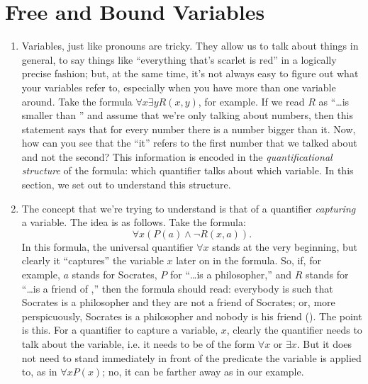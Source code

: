 \section{Free and Bound Variables}

	\begin{enumerate}[\thesection.1]

		
		\item Variables, just like pronouns are tricky. They allow us to talk about things in general, to say things like ``everything that's scarlet is red'' in a logically precise fashion; but, at the same time, it's not always easy to figure out what your variables refer to, especially when you have more than one variable around. Take the formula $\forall x\exists yR(x,y)$, for example. If we read $R$ as ``\dots is smaller than \underline{\phantom{\dots}}'' and assume that we're only talking about numbers, then this statement says that for every number there is a number bigger than it. Now, how can you see that the ``it'' refers to the first number that we talked about and not the second? This information is encoded in the \emph{quantificational structure} of the formula: which quantifier talks about which variable. In this section, we set out to understand this structure.
		
		\item The concept that we're trying to understand is that of a quantifier \emph{capturing} a variable. The idea is as follows. Take the formula: \[\forall x(P(a)\land \neg R(x,a)).\] In this formula, the universal quantifier $\forall x$ stands at the very beginning, but clearly it ``captures'' the variable $x$ later on in the formula. So, if, for example, $a$ stands for Socrates, $P$ for ``\dots is a philosopher,'' and $R$ stands for ``\dots is a friend of \underline{\phantom{\dots}},'' then the formula should read: everybody is such that Socrates is a philosopher and they are not a friend of Socrates; or, more perspicuously, Socrates is a philosopher and nobody is his friend (\frownie). The point is this. For a quantifier to capture a variable, $x$, clearly the quantifier needs to talk about the variable, i.e. it needs to be of the form $\forall x$ or $\exists x$. But it does not need to stand immediately in front of the predicate the variable is applied to, as in $\forall xP(x)$; no, it can be farther away as in our example. 
		

\end{enumerate}
